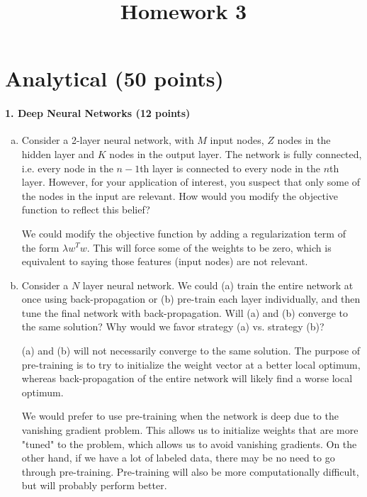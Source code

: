 \documentclass{article}
\begin{document}
\title{Homework 3}
\maketitle
\thispagestyle{fancy}


\section{Analytical (50 points)}

\paragraph{1. Deep Neural Networks (12 points)}

\begin{enumerate}[(a)]
	\item Consider a 2-layer neural network, with $M$ input nodes, $Z$ nodes in the hidden layer and $K$ nodes in the output layer. The network is fully connected, i.e. every node in the $n-1$th layer is connected to every node in the $n$th layer. However, for your application of interest, you suspect that only some of the nodes in the input are relevant. How would you modify the objective function to reflect this belief?
		\begin{answer*}
			We could modify the objective function by adding a regularization term of the form $\lambda w^T w.$ This will force some of the weights to be zero, which is equivalent to saying those features (input nodes) are not relevant.
		\end{answer*}

	\item Consider a $N$ layer neural network. We could (a) train the entire network at once using back-propagation or (b) pre-train each layer individually, and then tune the final network with back-propagation. Will (a) and (b) converge to the same solution? Why would we favor strategy (a) vs. strategy (b)?
		\begin{answer*}
			(a) and (b) will not necessarily converge to the same solution. The purpose of pre-training is to try to initialize the weight vector at a better local optimum, whereas back-propagation of the entire network will likely find a worse local optimum. 

			We would prefer to use pre-training when the network is deep due to the vanishing gradient problem. This allows us to initialize weights that are more "tuned" to the problem, which allows us to avoid vanishing gradients. On the other hand, if we have a lot of labeled data, there may be no need to go through pre-training. Pre-training will also be more computationally difficult, but will probably perform better.
		\end{answer*}


\end{enumerate}
\end{document}
